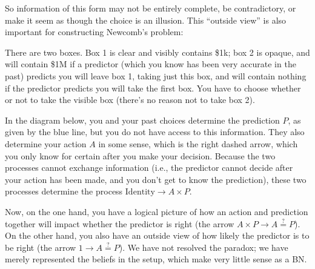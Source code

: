 \documentclass{article}
\begin{document}
	So information of this form may not be entirely complete, be contradictory, or make it seem as though the choice is an illusion. This ``outside view'' is also important for constructing Newcomb's problem:
	
	\begin{example}[Newcomb]
		There are two boxes. Box 1 is clear and visibly contains \$1k; box 2 is opaque, and will contain \$1M if a predictor (which you know has been very accurate in the past) predicts you will leave box 1, taking just this box, and will contain nothing if the predictor predicts you will take the first box. You have to choose whether or not to take the visible box (there's no reason not to take box 2).
		
		In the diagram below, you and your past choices determine the prediction $P$, as given by the blue line, but you do not have access to this information. They also determine your action $A$ in some sense, which is the right dashed arrow, which you only know for certain after you make your decision. Because the two processes cannot exchange information (i.e., the predictor cannot decide after your action has been made, and you don't get to know the prediction), these two processes determine the process $\mathrm{Identity} \to A \times P$.
		\begin{center}
		\end{center}
		Now, on the one hand, you have a logical picture of how an action and prediction together will impact whether the predictor is right (the arrow $A \times P \to A \stackrel{?}{=} P$). On the other hand, you also have an outside view of how likely the predictor is to be right (the arrow $1 \to A \stackrel{?}{=} P$). We have not resolved the paradox; we have merely represented the beliefs in the setup, which make very little sense as a BN.
	\end{example}
\end{document}
